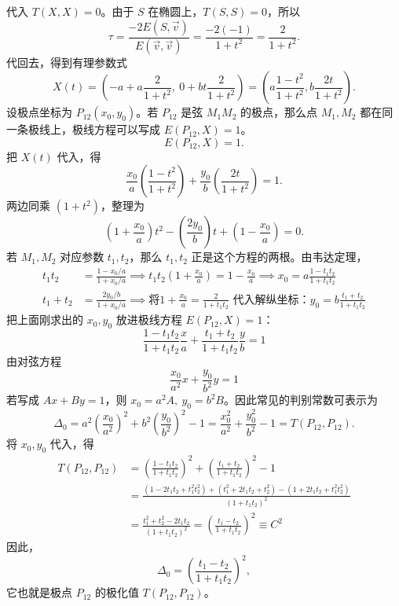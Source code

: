 代入 $T(X,X)=0$。由于 $S$ 在椭圆上，$T(S,S)=0$，所以
\[
\tau = \frac{-2E(S,\vec{v})}{E(\vec{v},\vec{v})} = \frac{-2(-1)}{1+t^2} = \frac{2}{1+t^2}.
\]
代回去，得到有理参数式
\[
X(t) = \left( -a + a\frac{2}{1+t^2}, \ 0 + bt\frac{2}{1+t^2} \right) = \left( a\frac{1-t^2}{1+t^2}, b\frac{2t}{1+t^2} \right).
\]
设极点坐标为 $P_{12}(x_0, y_0)$。若 $P_{12}$ 是弦 $M_1M_2$ 的极点，那么点 $M_1,M_2$ 都在同一条极线上，极线方程可以写成 $E(P_{12}, X) = 1$。
\[
E(P_{12}, X) = 1.
\]
把 $X(t)$ 代入，得
\[
\frac{x_0}{a}\left(\frac{1-t^2}{1+t^2}\right) + \frac{y_0}{b}\left(\frac{2t}{1+t^2}\right) = 1.
\]
两边同乘 $(1+t^2)$，整理为
\[
\left(1 + \frac{x_0}{a}\right)t^2 - \left(\frac{2y_0}{b}\right)t + \left(1 - \frac{x_0}{a}\right) = 0.
\]
若 $M_1,M_2$ 对应参数 $t_1,t_2$，那么 $t_1,t_2$ 正是这个方程的两根。由韦达定理，
\begin{align*}
    t_1 t_2 &= \frac{1 - x_0/a}{1 + x_0/a} \implies t_1 t_2 \left(1 + \frac{x_0}{a}\right) = 1 - \frac{x_0}{a} \implies {x_0 = a\frac{1-t_1t_2}{1+t_1t_2}} \\
    t_1 + t_2 &= \frac{2y_0/b}{1 + x_0/a} \implies \text{将} 1+\frac{x_0}{a} = \frac{2}{1+t_1t_2} \text{ 代入解纵坐标：} {y_0 = b\frac{t_1+t_2}{1+t_1t_2}}
\end{align*}
把上面刚求出的 $x_0, y_0$ 放进极线方程 $E(P_{12}, X) = 1$：
$$ \frac{1-t_1t_2}{1+t_1t_2} \frac{x}{a} + \frac{t_1+t_2}{1+t_1t_2} \frac{y}{b} = 1 $$
由对弦方程
\[
\frac{x_0}{a^2}x + \frac{y_0}{b^2}y = 1
\]
若写成 $Ax+By=1$，则 $x_0 = a^2A,\ y_0 = b^2B$。因此常见的判别常数可表示为
\[
\Delta_0 = a^2\left(\frac{x_0}{a^2}\right)^2 + b^2\left(\frac{y_0}{b^2}\right)^2 - 1 = \frac{x_0^2}{a^2} + \frac{y_0^2}{b^2} - 1 = T(P_{12},P_{12}).
\]
将 $x_0, y_0$ 代入，得
\begin{align*}
T(P_{12}, P_{12}) &= \left(\frac{1-t_1t_2}{1+t_1t_2}\right)^2 + \left(\frac{t_1+t_2}{1+t_1t_2}\right)^2 - 1 \\
&= \frac{(1 - 2t_1t_2 + t_1^2t_2^2) + (t_1^2 + 2t_1t_2 + t_2^2) - (1+2t_1t_2+t_1^2t_2^2)}{(1+t_1t_2)^2} \\
&= \frac{t_1^2 + t_2^2 - 2t_1t_2}{(1+t_1t_2)^2} = \left(\frac{t_1-t_2}{1+t_1t_2}\right)^2 \equiv C^2
\end{align*}
因此，
\[
\Delta_0 = \left(\frac{t_1-t_2}{1+t_1t_2}\right)^2,
\]
它也就是极点 $P_{12}$ 的极化值 $T(P_{12},P_{12})$。


